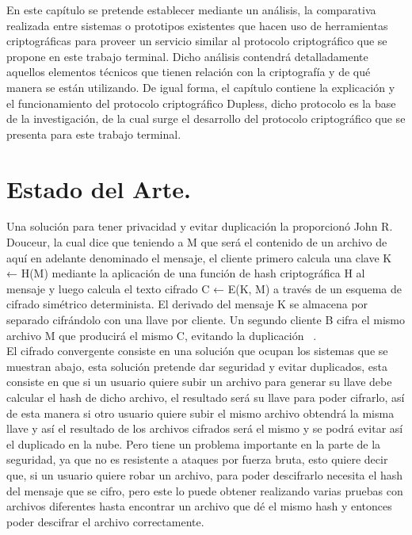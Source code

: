 
En este capítulo se pretende establecer mediante un análisis, la comparativa realizada entre sistemas o prototipos existentes que hacen uso de herramientas criptográficas para proveer un servicio similar al protocolo criptográfico que se propone en este trabajo terminal. Dicho análisis contendrá detalladamente aquellos elementos técnicos que tienen relación con la criptografía y de qué manera se están utilizando. De igual forma, el capítulo contiene la explicación y el funcionamiento del protocolo criptográfico Dupless, dicho protocolo es la base de la investigación, de la cual surge el desarrollo del protocolo criptográfico que se presenta para este trabajo terminal. 






\section{Estado del Arte. }

Una solución para tener privacidad y evitar duplicación la proporcionó John R. Douceur, la cual dice que teniendo a M que será el contenido de un archivo de aquí en adelante denominado el mensaje, el cliente primero calcula una clave K ← H(M) mediante la aplicación de una función de hash criptográfica H al mensaje y luego calcula el texto cifrado C ← E(K, M) a través de un esquema de cifrado simétrico determinista. El derivado del mensaje K se almacena por separado cifrándolo con una llave por cliente. Un segundo cliente B cifra el mismo archivo M que producirá el mismo C, evitando la duplicación ~\cite{donceur}. \\
El cifrado convergente consiste en una solución que ocupan los sistemas que se muestran abajo, esta solución pretende dar seguridad y evitar duplicados, esta consiste en que si un usuario quiere subir un archivo para generar su llave debe calcular el hash de dicho archivo, el resultado será su llave para poder cifrarlo, así de esta manera si otro usuario quiere subir el mismo archivo obtendrá la misma llave y así el resultado de los archivos cifrados será el mismo y se podrá evitar así el duplicado en la nube. Pero tiene un problema importante en la parte de la seguridad, ya que no es resistente a ataques por fuerza bruta, esto quiere decir que, si un usuario quiere robar un archivo, para poder descifrarlo necesita el hash del mensaje que se cifro, pero este lo puede obtener realizando varias pruebas con archivos diferentes hasta encontrar un archivo que dé el mismo hash y entonces poder descifrar el archivo correctamente.
\\

